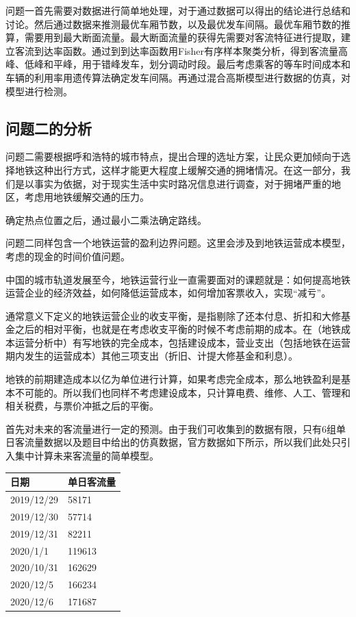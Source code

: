 \documentclass[12pt,a4paper]{mcmthesis}
\begin{document}
        {问题一首先需要对数据进行简单地处理，对于通过数据可以得出的结论进行总结和讨论。然后通过数据来推测最优车厢节数，以及最优发车间隔。最优车厢节数的推算，需要用到最大断面流量。最大断面流量的获得先需要对客流特征进行提取，建立客流到达率函数。通过到到达率函数用Fisher有序样本聚类分析，得到客流量高峰、低峰和平峰，用于错峰发车，划分调动时段。最后考虑乘客的等车时间成本和车辆的利用率用遗传算法确定发车间隔。再通过混合高斯模型进行数据的仿真，对模型进行检测。}

    \subsection{问题二的分析}

    问题二需要根据呼和浩特的城市特点，提出合理的选址方案，让民众更加倾向于选择地铁这种出行方式，这样才能更大程度上缓解交通的拥堵情况。在这一部分，我们是以事实为依据，对于现实生活中实时路况信息进行调查，对于拥堵严重的地区，考虑用地铁缓解交通的压力。

    确定热点位置之后，通过最小二乘法确定路线。

    问题二同样包含一个地铁运营的盈利边界问题。这里会涉及到地铁运营成本模型，考虑的现金的时间价值问题。

    中国的城市轨道发展至今，地铁运营行业一直需要面对的课题就是：如何提高地铁运营企业的经济效益，如何降低运营成本，如何增加客票收入，实现“减亏”。

    通常意义下定义的地铁运营企业的收支平衡，是指剔除了还本付息、折扣和大修基金之后的相对平衡，也就是在考虑收支平衡的时候不考虑前期的成本。在（地铁成本运营分析中）有写地铁的完全成本，包括建设成本，营业支出（包括地铁在运营期内发生的运营成本）其他三项支出（折旧、计提大修基金和利息）。

    地铁的前期建造成本以亿为单位进行计算，如果考虑完全成本，那么地铁盈利是基本不可能的。所以我们也同样不考虑建设成本，只计算电费、维修、人工、管理和相关税费，与票价冲抵之后的平衡。

    首先对未来的客流量进行一定的预测。由于我们可收集到的数据有限，只有6组单日客流量数据以及题目中给出的仿真数据，官方数据如下所示，所以我们此处只引入集中计算未来客流量的简单模型。

    \begin{table}
        \centering
        \begin{tabular}{|l|l|}
            \hline
            日期         & 单日客流量  \\ \hline
            2019/12/29 & 58171  \\ \hline
            2019/12/30 & 57714  \\ \hline
            2019/12/31 & 82211  \\ \hline
            2020/1/1   & 119613 \\ \hline
            2020/10/31 & 162629 \\ \hline
            2020/12/5  & 166234 \\ \hline
            2020/12/6  & 171687 \\ \hline
        \end{tabular}
    \end{table}
\end{document}
